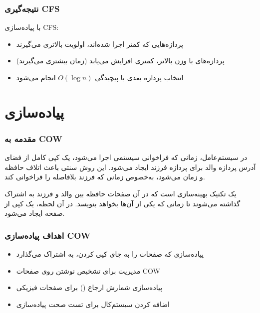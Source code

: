 \documentclass[12pt,a4paper]{article}
\begin{document}
\section{نتیجه‌گیری CFS}
با پیاده‌سازی CFS:
\begin{itemize}
    \item پردازه‌هایی که کمتر اجرا شده‌اند، اولویت بالاتری می‌گیرند
    \item پردازه‌های با وزن بالاتر،  کمتری افزایش می‌یابد (زمان بیشتری می‌گیرند)
    \item انتخاب پردازه بعدی با پیچیدگی $O(\log n)$ انجام می‌شود
\end{itemize}

\newpage


\part{پیاده‌سازی }

\section{مقدمه به COW}
در سیستم‌عامل، زمانی که فراخوانی سیستمی  اجرا می‌شود، یک کپی کامل از فضای آدرس پردازه والد برای پردازه فرزند ایجاد می‌شود. این روش سنتی باعث اتلاف حافظه و زمان می‌شود، به‌خصوص زمانی که فرزند بلافاصله  را فراخوانی کند.

\textbf{} یک تکنیک بهینه‌سازی است که در آن صفحات حافظه بین والد و فرزند به اشتراک گذاشته می‌شوند تا زمانی که یکی از آن‌ها بخواهد بنویسد. در آن لحظه، یک کپی از صفحه ایجاد می‌شود.

\section{اهداف پیاده‌سازی COW}
\begin{itemize}
    \item پیاده‌سازی  که صفحات را به جای کپی کردن، به اشتراک می‌گذارد
    \item مدیریت  برای تشخیص نوشتن روی صفحات COW
    \item پیاده‌سازی شمارش ارجاع () برای صفحات فیزیکی
    \item اضافه کردن سیستم‌کال  برای تست صحت پیاده‌سازی
\end{itemize}
\end{document}
